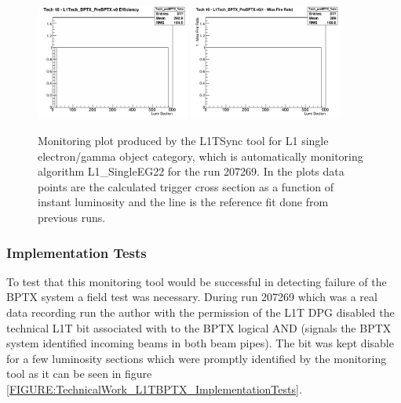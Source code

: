 \begin{figure}[!htb]
\centering
\includegraphics[width=0.45\textwidth]{Chapter03/L1TOnline/Images/L1TDQM_Online_Run207269_L1TBPTX_Efficiency_Tech_preBPTX_Veto.png}
\includegraphics[width=0.45\textwidth]{Chapter03/L1TOnline/Images/L1TDQM_Online_Run207269_L1TBPTX_MissFire_Tech_preBPTX_Veto.png}
\caption{Monitoring plot produced by the L1TSync tool for L1 single electron/gamma object category, which is
automatically monitoring algorithm L1\_SingleEG22 for the run 207269. In the plots data points are the calculated
trigger cross section as a function of instant luminosity and the line is the reference fit done from previous runs.}
\label{figure_ServiceWork_L1TSync}
\end{figure}

\subsubsection{Implementation Tests}


To test that this monitoring tool would be successful in detecting failure of the \gls{BPTX} system a field test was necessary. During run 207269 which was a real data recording run the author with the permission of the \gls{L1T} \gls{DPG} disabled the technical \gls{L1T} bit associated with to the \gls{BPTX} logical AND (signals the \gls{BPTX} system identified incoming beams in both beam pipes). The bit was kept disable for a few luminosity sections which were promptly identified by the monitoring tool as it can be seen in figure \ref{FIGURE:TechnicalWork_L1TBPTX_ImplementationTests}.

